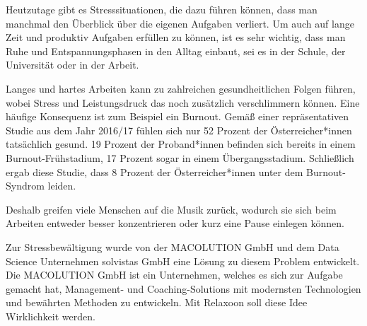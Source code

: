 
Heutzutage gibt es Stresssituationen, die dazu führen können, dass man manchmal den Überblick über die 
eigenen Aufgaben verliert. Um auch auf lange Zeit und produktiv Aufgaben erfüllen zu können, ist es sehr 
wichtig, dass man Ruhe und Entspannungsphasen in den Alltag einbaut, sei es in der Schule, der Universität
oder in der Arbeit. 

Langes und hartes Arbeiten kann zu zahlreichen gesundheitlichen Folgen führen, wobei Stress und 
Leistungsdruck das noch zusätzlich verschlimmern können. Eine häufige Konsequenz ist zum Beispiel
ein Burnout. Gemäß einer repräsentativen Studie aus dem Jahr 2016/17 fühlen sich nur 52 Prozent der 
Österreicher*innen tatsächlich gesund. 19 Prozent der Proband*innen befinden sich bereits in einem 
Burnout-Frühstadium, 17 Prozent sogar in einem Übergangsstadium. Schließlich ergab diese Studie, dass 
8 Prozent der Österreicher*innen unter dem Burnout-Syndrom leiden. \cite{burnout}

Deshalb greifen viele Menschen
auf die Musik zurück, wodurch sie sich beim Arbeiten entweder besser konzentrieren oder kurz
eine Pause einlegen können.

Zur Stressbewältigung wurde von der MACOLUTION GmbH und dem Data Science Unternehmen solvistas GmbH
eine Lösung zu diesem Problem entwickelt. 
Die MACOLUTION GmbH ist ein Unternehmen, welches es sich zur Aufgabe gemacht hat,
Management- und Coaching-Solutions mit modernsten Technologien und bewährten Methoden zu entwickeln.
\cite{MACOLUTION}
Mit Relaxoon soll diese Idee Wirklichkeit werden.

